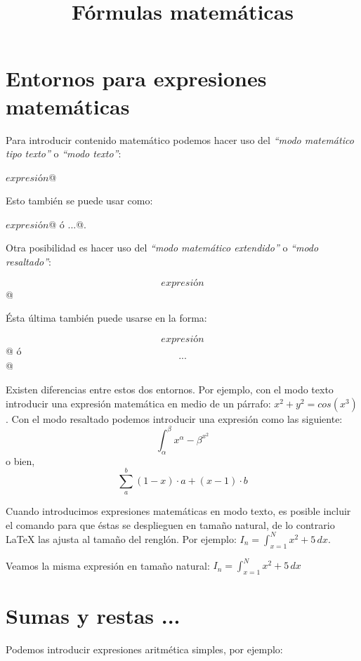 \documentclass[letterpaper,12pt]{article}
\title{Fórmulas matemáticas}
\begin{document}
\maketitle

\section{Entornos para expresiones matemáticas}

Para introducir contenido matemático podemos hacer uso del \textit{``modo matemático tipo texto''} o \textit{``modo texto''}:

\verb@$ expresión $@ 

Esto también se puede usar como:

\verb@\( expresión \)@ ó \verb@\begin{math}...\end{math}@.

Otra posibilidad es hacer uso del \textit{``modo matemático extendido''} o \textit{``modo resaltado''}:

\verb@$$ expresión $$@

Ésta última también puede usarse en la forma:

 \verb@\[ expresión \]@ ó \verb@\begin{displaymath} ... \end{displaymath}@

Existen diferencias entre estos dos entornos. Por ejemplo, con el modo texto introducir una expresión matemática en medio de un párrafo: $x^2 + y^2 = cos(x^3)$. 
Con el modo resaltado podemos introducir una expresión como las siguiente: $$ \int_{\alpha}^{\beta} x^{\alpha} - {\beta}^{x^2} $$ o bien, \[ \sum_{a}^{b} (1-x)\cdot a + (x-1)\cdot b \]

Cuando introducimos expresiones matemáticas en modo texto, es posible incluir el comando \verb@\dispalystyle@ para que éstas se desplieguen en 
tamaño natural, de lo contrario \LaTeX{} las ajusta al tamaño del renglón. Por ejemplo: $ I_n=\int_{x=1}^{N} x^2 + 5 \, dx  $. 

Veamos la misma expresión en tamaño natural: $\displaystyle I_n=\int_{x=1}^{N} x^2 + 5 \, dx  $

\section{Sumas y restas ...}

Podemos introducir expresiones aritmética simples, por ejemplo:
\end{document}
